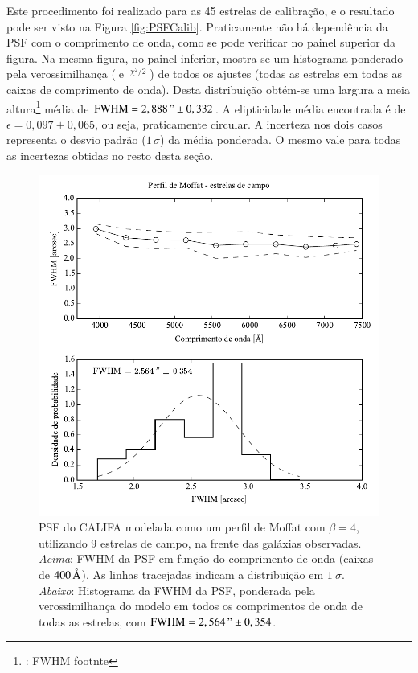 Este procedimento foi realizado para as 45 estrelas de calibração, e o resultado
pode ser visto na Figura \ref{fig:PSFCalib}. Praticamente não há dependência da
PSF com o comprimento de onda, como se pode verificar no painel superior da
figura. Na mesma figura, no painel inferior, mostra-se um histograma ponderado
pela verossimilhança ($\operatorname{e}^{-\chi^2/2}$) de todos os ajustes (todas
as estrelas em todas as caixas de comprimento de onda). Desta distribuição
obtém-se uma largura a meia altura\footnote{\TODO: FWHM footnte} média de
$\mathrm{FWHM}=2,888\," \pm 0,332$. A elipticidade média encontrada é de
$\epsilon=0,097 \pm 0,065$, ou seja, praticamente circular. A incerteza nos dois
casos representa o desvio padrão ($1\,\sigma$) da média ponderada. O mesmo vale
para todas as incertezas obtidas no resto desta seção.

\begin{figure}
	\includegraphics{figuras/PSFMoffatBeta4_field}
	\caption[PSF do CALIFA -- estrelas de campo.]
	{PSF do CALIFA modelada como um perfil de Moffat com $\beta=4$, utilizando 9
	estrelas de campo, na frente das galáxias observadas. {\em Acima}: FWHM da PSF
	em função do comprimento de onda (caixas de $400\,\text{\normalfont\AA}$). As linhas
	tracejadas indicam a distribuição em $1\ \sigma$. {\em Abaixo}: Histograma da
	FWHM da PSF, ponderada pela verossimilhança do modelo em todos os comprimentos
	de onda de todas as estrelas, com $\mathrm{FWHM}=2,564\," \pm 0,354$.}
	\label{fig:PSFField}
\end{figure}

